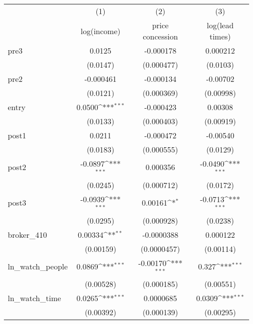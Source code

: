 {
\def\sym#1{\ifmmode^{#1}\else\(^{#1}\)\fi}
\begin{tabular}{l*{3}{c}}
\toprule
            &\multicolumn{1}{c}{(1)}&\multicolumn{1}{c}{(2)}&\multicolumn{1}{c}{(3)}\\
            &\multicolumn{1}{c}{log(income)}&\multicolumn{1}{c}{price concession}&\multicolumn{1}{c}{log(lead times)}\\
\midrule
pre3        &      0.0125         &   -0.000178         &    0.000212         \\
            &    (0.0147)         &  (0.000477)         &    (0.0103)         \\
\addlinespace
pre2        &   -0.000461         &   -0.000134         &    -0.00702         \\
            &    (0.0121)         &  (0.000369)         &   (0.00998)         \\
\addlinespace
entry       &      0.0500\sym{***}&   -0.000423         &     0.00308         \\
            &    (0.0133)         &  (0.000403)         &   (0.00919)         \\
\addlinespace
post1       &      0.0211         &   -0.000472         &    -0.00540         \\
            &    (0.0183)         &  (0.000555)         &    (0.0129)         \\
\addlinespace
post2       &     -0.0897\sym{***}&    0.000356         &     -0.0490\sym{***}\\
            &    (0.0245)         &  (0.000712)         &    (0.0172)         \\
\addlinespace
post3       &     -0.0939\sym{***}&     0.00161\sym{*}  &     -0.0713\sym{***}\\
            &    (0.0295)         &  (0.000928)         &    (0.0238)         \\
\addlinespace
broker\_410  &     0.00334\sym{**} &  -0.0000388         &    0.000122         \\
            &   (0.00159)         & (0.0000457)         &   (0.00114)         \\
\addlinespace
ln\_watch\_people&      0.0869\sym{***}&    -0.00170\sym{***}&       0.327\sym{***}\\
            &   (0.00528)         &  (0.000185)         &   (0.00551)         \\
\addlinespace
ln\_watch\_time&      0.0265\sym{***}&   0.0000685         &      0.0309\sym{***}\\
            &   (0.00392)         &  (0.000139)         &   (0.00295)         \\

\end{tabular}}
